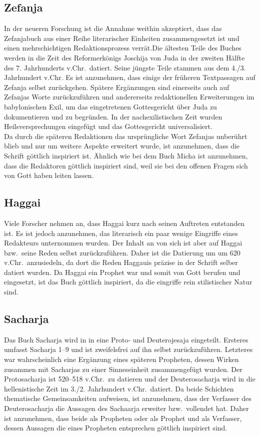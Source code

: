 \subsection*{Zefanja}
In der neueren Forschung ist die Annahme weithin akzeptiert, dass das Zefanjabuch aus einer Reihe literarischer Einheiten zusammengesetzt ist und einen mehrschichtigen Redaktionsprozess verrät.Die ältesten Teile des Buches werden in die Zeit des Reformerkönigs Joschija von Juda in der zweiten Hälfte des 7. Jahrhunderts v.Chr.\ datiert. Seine jüngste Teile stammen aus dem 4./3. Jahrhundert v.Chr. Es ist anzunehmen, dass einige der früheren Textpassagen auf Zefanja selbst zurückgehen. Spätere Ergänzungen sind einerseits auch auf Zefanjas Worte zurückzuführen und andererseits redaktionellen Erweiterungen im babylonischen Exil, um das eingetretenen Gottesgericht über Juda zu dokumentieren und zu begründen. In der nachexilistischen Zeit wurden Heilsversprechungen eingefügt und das Gottesgericht universalisiert.
\\
Da durch die späteren Redaktionen das ursprüngliche Wort Zefanjas unberührt blieb und nur um weitere Aspekte erweitert wurde, ist anzunehmen, dass die Schrift göttlich inspiriert ist. Ähnlich wie bei dem Buch Micha ist anzunehmen, dass die Redaktoren göttlich inspiriert sind, weil sie bei den offenen Fragen sich von Gott haben leiten lassen.

\subsection*{Haggai}
Viele Forscher nehmen an, dass Haggai kurz nach seinen Auftreten entstanden ist. Es ist jedoch anzunehmen, das literarisch ein paar wenige Eingriffe eines Redakteurs unternommen wurden. Der Inhalt an von sich ist aber auf Haggai bzw.\ seine Reden selbst zurückzuführen. Daher ist die Datierung um um 620 v.Chr.\ anzusiedeln, da dort die Reden Haggauis präzise in der Schrift selber datiert wurden. Da Haggai ein Prophet war und somit von Gott berufen und eingesetzt, ist das Buch göttlich inspiriert, da die eingriffe rein stilistischer Natur sind.
\pagebreak
\subsection*{Sacharja}
Das Buch Sacharja wird in in eine Proto- und Deuterojesaja eingeteilt. Ersteres umfasst Sacharja 1--9 und ist zweifelsfrei auf ihn selbst zurückzuführen. Letzteres war wahrscheinlich eine Ergänzung eines späteren Propheten, dessen Wirken zusammen mit Sacharjas zu einer Sinneseinheit zusammengefügt wurden. Der Protosacharja ist 520--518 v.Chr.\ zu datieren und der Deuterosacharja wird in die hellenistische Zeit im 3./2. Jahrhundert v.Chr.\ datiert. Da beide Schichten thematische Gemeinsamkeiten aufweisen, ist anzunehmen, dass der Verfasser des Deuterosacharja die Aussagen des Sachaarja erweiter bzw.\ vollendet hat. Daher ist anzunehmen, dass beide als Propheten oder als Prophet und als Verfasser, dessen Aussagen die eines Propheten entsprechen göttlich inspiriert sind.

